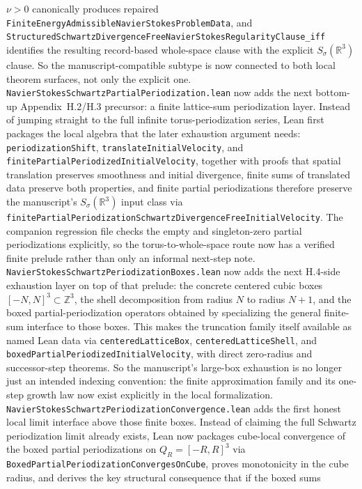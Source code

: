 \documentclass[11pt]{article}
\begin{document}
\(\nu > 0\) canonically produces repaired
\texttt{FiniteEnergyAdmissibleNavierStokesProblemData}, and
\texttt{StructuredSchwartzDivergenceFreeNavierStokesRegularityClause\_iff}
identifies the resulting record-based whole-space clause with the explicit
\(S_\sigma(\mathbb{R}^3)\) clause.  So the manuscript-compatible subtype is now
connected to both local theorem surfaces, not only the explicit one.
\texttt{NavierStokesSchwartzPartialPeriodization.lean} now adds the next
bottom-up Appendix~H.2/H.3 precursor: a finite lattice-sum periodization layer.
Instead of jumping straight to the full infinite torus-periodization series,
Lean first packages the local algebra that the later exhaustion argument needs:
\texttt{periodizationShift}, \texttt{translateInitialVelocity}, and
\texttt{finitePartialPeriodizedInitialVelocity}, together with proofs that
spatial translation preserves smoothness and initial divergence, finite sums of
translated data preserve both properties, and finite partial periodizations
therefore preserve the manuscript's \(S_\sigma(\mathbb{R}^3)\) input class via
\texttt{finitePartialPeriodizationSchwartzDivergenceFreeInitialVelocity}.  The
companion regression file checks the empty and singleton-zero partial
periodizations explicitly, so the torus-to-whole-space route now has a verified
finite prelude rather than only an informal next-step note.
\texttt{NavierStokesSchwartzPeriodizationBoxes.lean} now adds the next H.4-side
exhaustion layer on top of that prelude: the concrete centered cubic boxes
\([-N,N]^3 \subset \mathbb{Z}^3\), the shell decomposition from radius \(N\) to
radius \(N+1\), and the boxed partial-periodization operators obtained by
specializing the general finite-sum interface to those boxes.  This makes the
truncation family itself available as named Lean data via
\texttt{centeredLatticeBox}, \texttt{centeredLatticeShell}, and
\texttt{boxedPartialPeriodizedInitialVelocity}, with direct zero-radius and
successor-step theorems.  So the manuscript's large-box exhaustion is no longer
just an intended indexing convention: the finite approximation family and its
one-step growth law now exist explicitly in the local formalization.
\texttt{NavierStokesSchwartzPeriodizationConvergence.lean} adds the first
honest local limit interface above those finite boxes.  Instead of claiming the
full Schwartz periodization limit already exists, Lean now packages
cube-local convergence of the boxed partial periodizations on
\(Q_R = [-R,R]^3\) via
\texttt{BoxedPartialPeriodizationConvergesOnCube}, proves monotonicity in the
cube radius, and derives the key structural consequence that if the boxed sums
\end{document}
